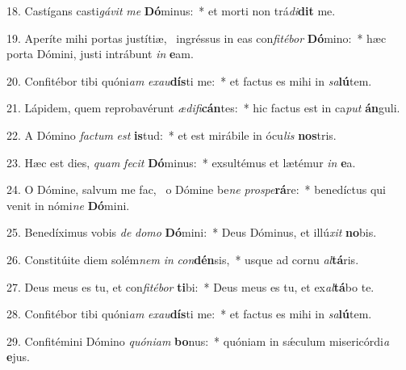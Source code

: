 18. Castígans casti\textit{gá}\textit{vit} \textit{me} \textbf{Dó}minus:~*  et morti non trá\textit{di}\textbf{dit} me.\

19. Aperíte mihi portas justítiæ, \dag\  ingréssus in eas con\textit{fi}\textit{té}\textit{bor} \textbf{Dó}mino:~*  hæc porta Dómini, justi intrábunt \textit{in} \textbf{e}am.\

20. Confitébor tibi quóni\textit{am} \textit{ex}\textit{au}\textbf{dís}ti me:~*  et factus es mihi in \textit{sa}\textbf{lú}tem.\

21. Lápidem, quem reprobavérunt \textit{æ}\textit{di}\textit{fi}\textbf{cán}tes:~*  hic factus est in ca\textit{put} \textbf{án}guli.\

22. A Dómino \textit{fac}\textit{tum} \textit{est} \textbf{is}tud:~*  et est mirábile in ócu\textit{lis} \textbf{nos}tris.\

23. Hæc est dies, \textit{quam} \textit{fe}\textit{cit} \textbf{Dó}minus:~*  exsultémus et lætémur \textit{in} \textbf{e}a.\

24. O Dómine, salvum me fac, \dag\  o Dómine be\textit{ne} \textit{pro}\textit{spe}\textbf{rá}re:~*  benedíctus qui venit in nómi\textit{ne} \textbf{Dó}mini.\

25. Benedíximus vobis \textit{de} \textit{do}\textit{mo} \textbf{Dó}mini:~*  Deus Dóminus, et illú\textit{xit} \textbf{no}bis.\

26. Constitúite diem solém\textit{nem} \textit{in} \textit{con}\textbf{dén}sis,~*  usque ad cornu \textit{al}\textbf{tá}ris.\

27. Deus meus es tu, et con\textit{fi}\textit{té}\textit{bor} \textbf{ti}bi:~*  Deus meus es tu, et ex\textit{al}\textbf{tá}bo te.\

28. Confitébor tibi quóni\textit{am} \textit{ex}\textit{au}\textbf{dís}ti me:~*  et factus es mihi in \textit{sa}\textbf{lú}tem.\

29. Confitémini Dómino \textit{quón}\textit{i}\textit{am} \textbf{bo}nus:~*  quóniam in sǽculum misericórdi\textit{a} \textbf{e}jus.\

